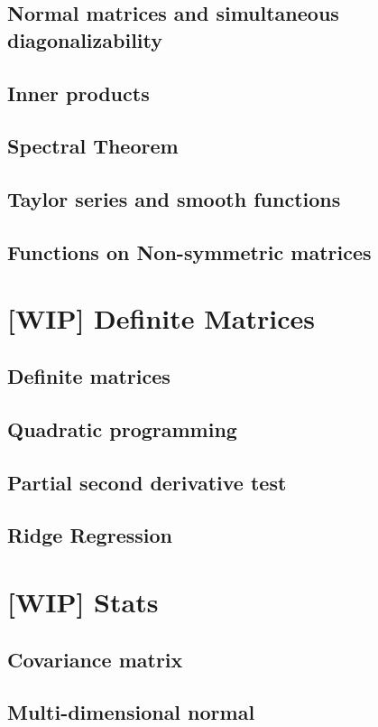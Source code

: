\documentclass{amsbook}
\begin{document}
\section{Normal matrices and simultaneous diagonalizability}
\section{Inner products}
\section{Spectral Theorem}
\section{Taylor series and smooth functions}\label{section_taylor_series}
\section{Functions on Non-symmetric matrices}

\chapter{[WIP] Definite Matrices}
\section{Definite matrices}
\section{Quadratic programming}
\section{Partial second derivative test}
\section{Ridge Regression}

\chapter{[WIP] Stats}
\section{Covariance matrix}\label{Section-Covariance}
\section{Multi-dimensional normal}
\end{document}
